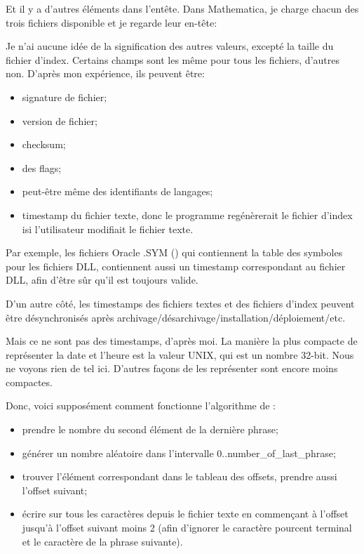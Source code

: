 Et il y a d'autres éléments dans l'entête.
Dans Mathematica, je charge chacun des trois fichiers disponible et je regarde leur en-tête:

\begin{figure}[H]
\centering
{}
\end{figure}

Je n'ai aucune idée de la signification des autres valeurs, excepté la taille du
fichier d'index.
Certains champs sont les même pour tous les fichiers, d'autres non.
D'après mon expérience, ils peuvent être:

\begin{itemize}
\item signature de fichier;
\item version de fichier;
\item checksum;
\item des flags;
\item peut-être même des identifiants de langages;
\item timestamp du fichier texte, donc le programme  regénèrerait le
fichier d'index isi l'utilisateur modifiait le fichier texte.
\end{itemize}

Par exemple, les fichiers Oracle .SYM () qui contiennent
la table des symboles pour les fichiers DLL, contiennent aussi un timestamp correspondant
au fichier DLL, afin d'être sûr qu'il est toujours valide.

D'un autre côté, les timestamps des fichiers textes et des fichiers d'index peuvent
être désynchronisés après archivage/désarchivage/installation/déploiement/etc.

Mais ce ne sont pas des timestamps, d'après moi. La manière la plus compacte de représenter
la date et l'heure est la valeur UNIX, qui est un nombre 32-bit. Nous ne voyons rien
de tel ici. D'autres façons de les représenter sont encore moins compactes.

Donc, voici supposément comment fonctionne l'algorithme de :

\begin{itemize}
\item prendre le nombre du second élément de la dernière phrase;
\item générer un nombre aléatoire dans l'intervalle 0..number\_of\_last\_phrase;
\item trouver l'élément correspondant dans le tableau des offsets, prendre aussi
l'offset suivant;
\item écrire sur  tous les caractères depuis le fichier texte en commençant
à l'offset jusqu'à l'offset suivant moins 2 (afin d'ignorer le caractère pourcent
terminal et le caractère de la phrase suivante).
\end{itemize}

